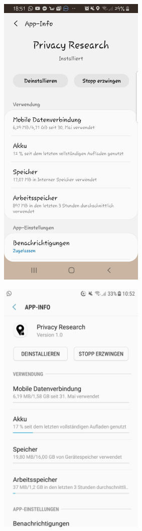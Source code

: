 \begin{center}
\includegraphics[width=200pt]{data/data-usage/data-usage4.jpeg}
\end{center}
\begin{center}
\includegraphics[width=200pt]{data/data-usage/data-usage5.jpeg}
\end{center}
